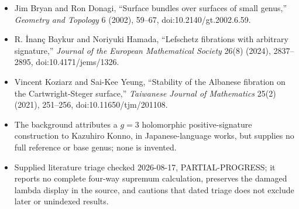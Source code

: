 \documentclass[11pt]{article}
\begin{document}
\begin{itemize}
\item [BD02] Jim Bryan and Ron Donagi, ``Surface bundles over surfaces of small genus,'' \emph{Geometry and Topology} 6 (2002), 59--67, doi:10.2140/gt.2002.6.59.
\item [BH24c] R. İnanç Baykur and Noriyuki Hamada, ``Lefschetz fibrations with arbitrary signature,'' \emph{Journal of the European Mathematical Society} 26(8) (2024), 2837--2895, doi:10.4171/jems/1326.
\item [KY21] Vincent Koziarz and Sai-Kee Yeung, ``Stability of the Albanese fibration on the Cartwright-Steger surface,'' \emph{Taiwanese Journal of Mathematics} 25(2) (2021), 251--256, doi:10.11650/tjm/201108.
\item The background attributes a $g=3$ holomorphic positive-signature construction to Kazuhiro Konno, in Japanese-language works, but supplies no full reference or base genus; none is invented.
\item Supplied literature triage checked 2026-08-17, PARTIAL-PROGRESS; it reports no complete four-way supremum calculation, preserves the damaged lambda display in the source, and cautions that dated triage does not exclude later or unindexed results.
\end{itemize}
\end{document}
